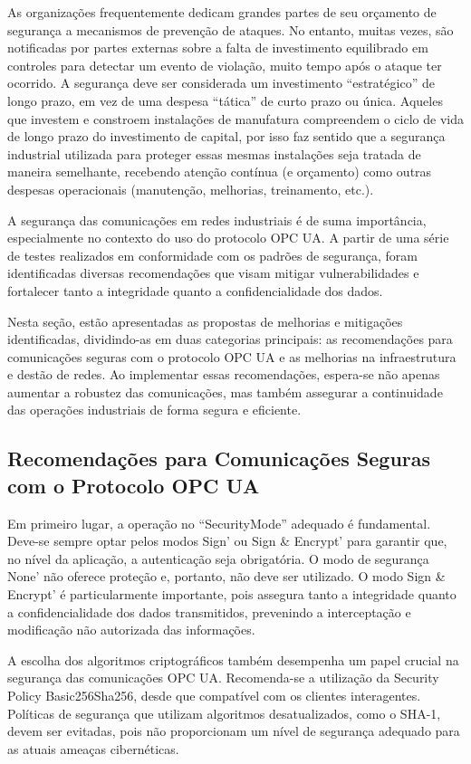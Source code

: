 As organizações frequentemente dedicam grandes partes de seu orçamento de segurança a mecanismos de prevenção de ataques. No entanto, muitas vezes, são notificadas por partes externas sobre a falta de investimento equilibrado em controles para detectar um evento de violação, muito tempo após o ataque ter ocorrido. A segurança deve ser considerada um investimento ``estratégico'' de longo prazo, em vez de uma despesa ``tática'' de curto prazo ou única. Aqueles que investem e constroem instalações de manufatura compreendem o ciclo de vida de longo prazo do investimento de capital, por isso faz sentido que a segurança industrial utilizada para proteger essas mesmas instalações seja tratada de maneira semelhante, recebendo atenção contínua (e orçamento) como outras despesas operacionais (manutenção, melhorias, treinamento, etc.).

A segurança das comunicações em redes industriais é de suma importância, especialmente no contexto do uso do protocolo OPC UA. A partir de uma série de testes realizados em conformidade com os padrões de segurança, foram identificadas diversas recomendações que visam mitigar vulnerabilidades e fortalecer tanto a integridade quanto a confidencialidade dos dados.

Nesta seção, estão apresentadas as propostas de melhorias e mitigações identificadas, dividindo-as em duas categorias principais: as recomendações para comunicações seguras com o protocolo OPC UA e as melhorias na infraestrutura e destão de redes. Ao implementar essas recomendações, espera-se não apenas aumentar a robustez das comunicações, mas também assegurar a continuidade das operações industriais de forma segura e eficiente.

\subsection{Recomendações para Comunicações Seguras com o Protocolo OPC UA}

Em primeiro lugar, a operação no ``SecurityMode'' adequado é fundamental. Deve-se sempre optar pelos modos Sign' ou Sign \& Encrypt' para garantir que, no nível da aplicação, a autenticação seja obrigatória. O modo de segurança None' não oferece proteção e, portanto, não deve ser utilizado. O modo Sign \& Encrypt' é particularmente importante, pois assegura tanto a integridade quanto a confidencialidade dos dados transmitidos, prevenindo a interceptação e modificação não autorizada das informações.

A escolha dos algoritmos criptográficos também desempenha um papel crucial na segurança das comunicações OPC UA. Recomenda-se a utilização da Security Policy Basic256Sha256, desde que compatível com os clientes interagentes. Políticas de segurança que utilizam algoritmos desatualizados, como o SHA-1, devem ser evitadas, pois não proporcionam um nível de segurança adequado para as atuais ameaças cibernéticas.

